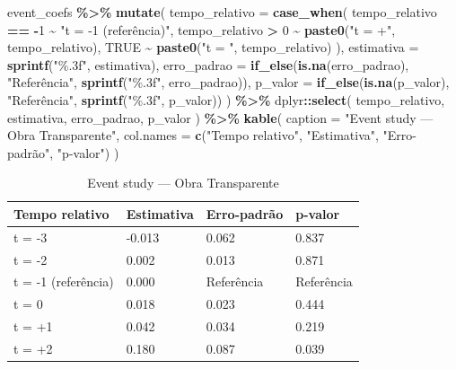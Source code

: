 \documentclass[
]{article}
\newenvironment{Shaded}{\begin{snugshade}}{\end{snugshade}}
\newcommand{\AttributeTok}[1]{\textcolor[rgb]{0.13,0.29,0.53}{#1}}
\newcommand{\ConstantTok}[1]{\textcolor[rgb]{0.56,0.35,0.01}{#1}}
\newcommand{\DecValTok}[1]{\textcolor[rgb]{0.00,0.00,0.81}{#1}}
\newcommand{\FunctionTok}[1]{\textcolor[rgb]{0.13,0.29,0.53}{\textbf{#1}}}
\newcommand{\NormalTok}[1]{#1}
\newcommand{\SpecialCharTok}[1]{\textcolor[rgb]{0.81,0.36,0.00}{\textbf{#1}}}
\newcommand{\StringTok}[1]{\textcolor[rgb]{0.31,0.60,0.02}{#1}}
\begin{document}
\begin{Shaded}
\begin{Highlighting}[]
\NormalTok{event\_coefs }\SpecialCharTok{\%\textgreater{}\%}
  \FunctionTok{mutate}\NormalTok{(}
    \AttributeTok{tempo\_relativo =} \FunctionTok{case\_when}\NormalTok{(}
\NormalTok{      tempo\_relativo }\SpecialCharTok{==} \SpecialCharTok{{-}}\DecValTok{1} \SpecialCharTok{\textasciitilde{}} \StringTok{"t = {-}1 (referência)"}\NormalTok{,}
\NormalTok{      tempo\_relativo }\SpecialCharTok{\textgreater{}} \DecValTok{0} \SpecialCharTok{\textasciitilde{}} \FunctionTok{paste0}\NormalTok{(}\StringTok{"t = +"}\NormalTok{, tempo\_relativo),}
      \ConstantTok{TRUE} \SpecialCharTok{\textasciitilde{}} \FunctionTok{paste0}\NormalTok{(}\StringTok{"t = "}\NormalTok{, tempo\_relativo)}
\NormalTok{    ),}
    \AttributeTok{estimativa =} \FunctionTok{sprintf}\NormalTok{(}\StringTok{"\%.3f"}\NormalTok{, estimativa),}
    \AttributeTok{erro\_padrao =} \FunctionTok{if\_else}\NormalTok{(}\FunctionTok{is.na}\NormalTok{(erro\_padrao), }\StringTok{"Referência"}\NormalTok{, }\FunctionTok{sprintf}\NormalTok{(}\StringTok{"\%.3f"}\NormalTok{, erro\_padrao)),}
    \AttributeTok{p\_valor =} \FunctionTok{if\_else}\NormalTok{(}\FunctionTok{is.na}\NormalTok{(p\_valor), }\StringTok{"Referência"}\NormalTok{, }\FunctionTok{sprintf}\NormalTok{(}\StringTok{"\%.3f"}\NormalTok{, p\_valor))}
\NormalTok{  ) }\SpecialCharTok{\%\textgreater{}\%}
\NormalTok{  dplyr}\SpecialCharTok{::}\FunctionTok{select}\NormalTok{(}
\NormalTok{    tempo\_relativo,}
\NormalTok{    estimativa,}
\NormalTok{    erro\_padrao,}
\NormalTok{    p\_valor}
\NormalTok{  ) }\SpecialCharTok{\%\textgreater{}\%}
  \FunctionTok{kable}\NormalTok{(}
    \AttributeTok{caption =} \StringTok{"Event study — Obra Transparente"}\NormalTok{,}
    \AttributeTok{col.names =} \FunctionTok{c}\NormalTok{(}\StringTok{"Tempo relativo"}\NormalTok{, }\StringTok{"Estimativa"}\NormalTok{, }\StringTok{"Erro{-}padrão"}\NormalTok{, }\StringTok{"p{-}valor"}\NormalTok{)}
\NormalTok{  )}
\end{Highlighting}
\end{Shaded}

\begin{table}

\caption{\label{tab:ot-event-study}Event study — Obra Transparente}
\centering
\begin{tabular}[t]{l|l|l|l}
\hline
Tempo relativo & Estimativa & Erro-padrão & p-valor\\
\hline
t = -3 & -0.013 & 0.062 & 0.837\\
\hline
t = -2 & 0.002 & 0.013 & 0.871\\
\hline
t = -1 (referência) & 0.000 & Referência & Referência\\
\hline
t = 0 & 0.018 & 0.023 & 0.444\\
\hline
t = +1 & 0.042 & 0.034 & 0.219\\
\hline
t = +2 & 0.180 & 0.087 & 0.039\\
\hline
\end{tabular}
\end{table}
\end{document}
